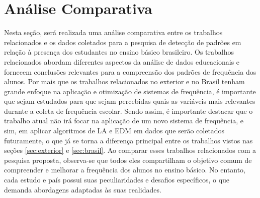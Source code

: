 
\section{Análise Comparativa}


Nesta seção, será realizada uma análise comparativa entre os trabalhos relacionados e os dados coletados para a pesquisa de detecção de padrões em relação à presença dos estudantes no ensino básico brasileiro. Os trabalhos relacionados abordam diferentes aspectos da análise de dados educacionais e fornecem conclusões relevantes para a compreensão dos padrões de frequência dos alunos. Por mais que os trabalhos relacionados no exterior e no Brasil tenham grande enfoque na aplicação e otimização de sistemas de frequência, é importante que sejam estudados para que sejam percebidas quais as variáveis mais relevantes durante a coleta de frequência escolar. Sendo assim, é importante destacar que o trabalho atual não irá focar na aplicação de um novo sistema de frequência, e sim, em aplicar algoritmos de LA e EDM em dados que serão coletados futuramente, o que já se torna a diferença principal entre os trabalhos vistos nas seções \ref{sec:exterior} e \ref{sec:brasil}. Ao comparar esses trabalhos relacionados com a pesquisa proposta, observa-se que todos eles compartilham o objetivo comum de compreender e melhorar a frequência dos alunos no ensino básico. No entanto, cada estudo e país possui suas peculiaridades e desafios específicos, o que demanda abordagens adaptadas às suas realidades.


